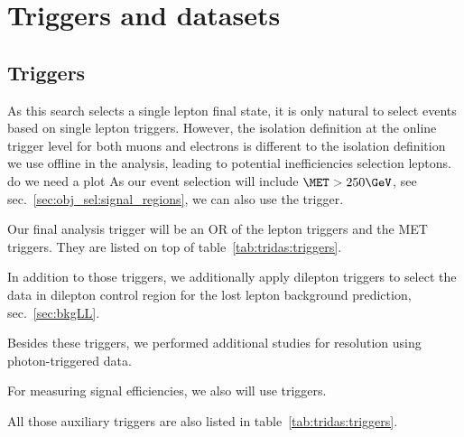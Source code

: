\section{Triggers and datasets}
\label{sec:tridas}

\subsection{Triggers}
\label{sec:triggers}

As this search selects a single lepton final state, it is only natural to select events based on single lepton triggers.
However, the isolation definition at the online trigger level for both muons and electrons is different to the isolation definition we use offline in the analysis, leading to potential inefficiencies selection leptons. {\color{red} do we need a plot}
As our event selection will include $\MET>250\GeV$, see sec.~\ref{sec:obj_sel:signal_regions}, we can also use the \MET trigger.

Our final analysis trigger will be an OR of the lepton triggers and the MET triggers. They are listed on top of table~\ref{tab:tridas:triggers}.

In addition to those triggers, we additionally apply dilepton triggers to select the data in dilepton control region for the lost lepton background prediction, sec.~\ref{sec:bkgLL}.

Besides these triggers, we performed additional studies for \MET resolution using photon-triggered data.

For measuring signal efficiencies, we also will use \HT triggers.

All those auxiliary triggers are also listed in table~\ref{tab:tridas:triggers}.

